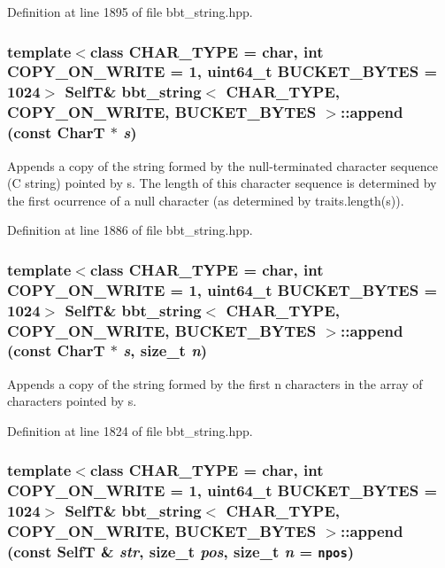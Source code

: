Definition at line 1895 of file bbt\_\-string.hpp.\hypertarget{classbbt__string_a5c997633467454dc7f88198d818a564}{
\subsubsection[{append}]{\setlength{\rightskip}{0pt plus 5cm}template$<$class CHAR\_\-TYPE  = char, int COPY\_\-ON\_\-WRITE = 1, uint64\_\-t BUCKET\_\-BYTES = 1024$>$ {\bf SelfT}\& {\bf bbt\_\-string}$<$ CHAR\_\-TYPE, COPY\_\-ON\_\-WRITE, BUCKET\_\-BYTES $>$::append (const CharT $\ast$ {\em s})}}
\label{classbbt__string_a5c997633467454dc7f88198d818a564}


Appends a copy of the string formed by the null-terminated character sequence (C string) pointed by s. The length of this character sequence is determined by the first ocurrence of a null character (as determined by traits.length(s)). 

Definition at line 1886 of file bbt\_\-string.hpp.\hypertarget{classbbt__string_6386d346b67e828d43b66f44037a66b3}{
\subsubsection[{append}]{\setlength{\rightskip}{0pt plus 5cm}template$<$class CHAR\_\-TYPE  = char, int COPY\_\-ON\_\-WRITE = 1, uint64\_\-t BUCKET\_\-BYTES = 1024$>$ {\bf SelfT}\& {\bf bbt\_\-string}$<$ CHAR\_\-TYPE, COPY\_\-ON\_\-WRITE, BUCKET\_\-BYTES $>$::append (const CharT $\ast$ {\em s}, \/  size\_\-t {\em n})}}
\label{classbbt__string_6386d346b67e828d43b66f44037a66b3}


Appends a copy of the string formed by the first n characters in the array of characters pointed by s. 

Definition at line 1824 of file bbt\_\-string.hpp.\hypertarget{classbbt__string_9f1e0deb4ea27ec60dc578bb4d3cb7b8}{
\subsubsection[{append}]{\setlength{\rightskip}{0pt plus 5cm}template$<$class CHAR\_\-TYPE  = char, int COPY\_\-ON\_\-WRITE = 1, uint64\_\-t BUCKET\_\-BYTES = 1024$>$ {\bf SelfT}\& {\bf bbt\_\-string}$<$ CHAR\_\-TYPE, COPY\_\-ON\_\-WRITE, BUCKET\_\-BYTES $>$::append (const {\bf SelfT} \& {\em str}, \/  size\_\-t {\em pos}, \/  size\_\-t {\em n} = {\tt npos})}}
\label{classbbt__string_9f1e0deb4ea27ec60dc578bb4d3cb7b8}


